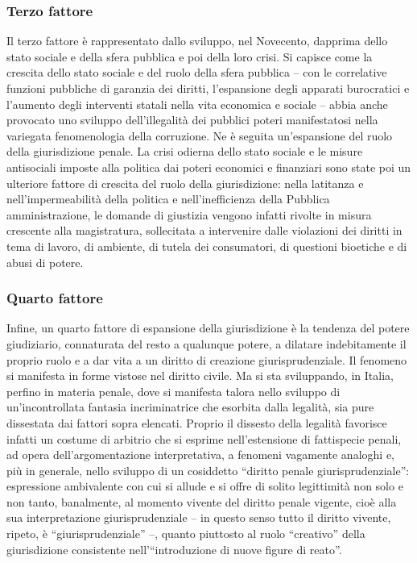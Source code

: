 \subsubsection{Terzo fattore}
Il terzo fattore è rappresentato dallo sviluppo, nel Novecento, dapprima dello stato sociale e della sfera pubblica e poi della loro crisi. Si capisce come la crescita dello stato sociale e del ruolo della sfera pubblica – con le correlative funzioni pubbliche di garanzia dei diritti, l’espansione degli apparati burocratici e l’aumento degli interventi statali nella vita economica e sociale – abbia anche provocato uno sviluppo dell’illegalità dei pubblici poteri manifestatosi nella variegata fenomenologia della corruzione. Ne è seguita un’espansione del ruolo della giurisdizione penale. La crisi odierna dello stato sociale e le misure antisociali imposte alla politica dai poteri economici e finanziari sono state poi un ulteriore fattore di crescita del ruolo della giurisdizione: nella latitanza e nell’impermeabilità della politica e nell’inefficienza della Pubblica amministrazione, le domande di giustizia vengono infatti rivolte in misura crescente alla magistratura, sollecitata a intervenire dalle violazioni dei diritti in tema di lavoro, di ambiente, di tutela dei consumatori, di questioni bioetiche e di abusi di potere.

\subsubsection{Quarto fattore}
Infine, un quarto fattore di espansione della giurisdizione è la tendenza del potere giudiziario, connaturata del resto a qualunque potere, a dilatare indebitamente il proprio ruolo e a dar vita a un diritto di creazione giurisprudenziale. Il fenomeno si manifesta in forme vistose nel diritto civile. Ma si sta sviluppando, in Italia, perfino in materia penale, dove si manifesta talora nello sviluppo di un’incontrollata fantasia incriminatrice che esorbita dalla legalità, sia pure dissestata dai fattori sopra elencati. Proprio il dissesto della legalità favorisce infatti un costume di arbitrio che si esprime nell’estensione di fattispecie penali, ad opera dell’argomentazione interpretativa, a fenomeni vagamente analoghi e, più in generale, nello sviluppo di un cosiddetto “diritto penale giurisprudenziale”: espressione ambivalente con cui si allude e si offre di solito legittimità non solo e non tanto, banalmente, al momento vivente del diritto penale vigente, cioè alla sua interpretazione giurisprudenziale – in questo senso tutto il diritto vivente, ripeto, è “giurisprudenziale” –, quanto piuttosto al ruolo “creativo” della giurisdizione consistente nell’“introduzione di nuove figure di reato”.

